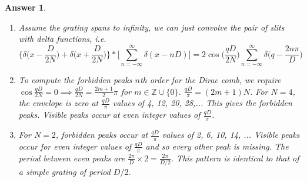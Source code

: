 \documentclass[a4paper]{article}
\newtheorem{ans}{Answer}[section]
\theoremstyle{new}
\begin{document}
\begin{ans}\leavevmode
\begin{enumerate}[label=(\alph*)]
\item Assume the grating spans to infinity, we can just convolve the pair of slits with delta functions, i.e.
$$\bigg\{\delta\bigg(x-\frac{D}{2N}\bigg)+\delta\bigg(x+\frac{D}{2N}\bigg)\bigg\}*\bigg[\sum_{n=-\infty}^\infty\delta(x-nD)\bigg]=2\cos\bigg(\frac{qD}{2N}\bigg)\sum_{n=-\infty}^\infty\delta\bigg(q-\frac{2n\pi}{D}\bigg)$$
\item To compute the forbidden peaks $n$th order for the Dirac comb, we require $\cos\frac{qD}{2N}=0\implies\frac{qD}{2N}=\frac{2m+1}{2}\pi$ for $m\in\mathbb{Z}\cup\{0\}$. $\frac{qD}{\pi}=(2m+1)N$. For $N=4$, the envelope is zero at $\frac{qD}{\pi}$ values of 4, 12, 20, 28,... This gives the forbidden peaks. Visible peaks occur at even integer values of $\frac{qD}{\pi}$.
\item For $N=2$, forbidden peaks occur at $\frac{qD}{\pi}$ values of 2, 6, 10, 14, ... Visible peaks occur for even integer values of $\frac{qD}{\pi}$ and so every other peak is missing. The period between even peaks are $\frac{2\pi}{D}\times 2=\frac{2\pi}{D/2}$. This pattern is identical to that of a simple grating of period $D/2$.
\end{enumerate}
\end{ans}
\end{document}

